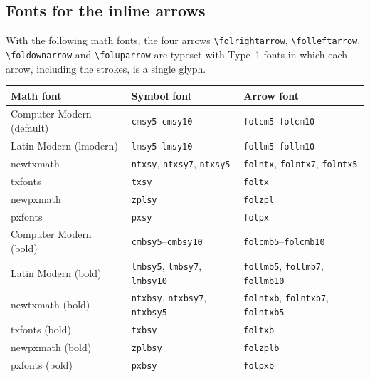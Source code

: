 \documentclass[dvipdfmx,a4paper]{article}
\newcommand\pkg[1]{\textsf{#1}}
\newcommand\file[1]{\texttt{#1}}
\begin{document}
\subsection{Fonts for the inline arrows}\label{sec:glyphs}
With the following math fonts, the four arrows \verb|\folrightarrow|, \verb|\folleftarrow|,
\verb|\foldownarrow| and \verb|\foluparrow| are typeset with Type~1 fonts in which each arrow,
including the strokes, is a single glyph.
\begin{center}
\begin{tabular}{lll}
Math font & Symbol font & Arrow font\\\hline
Computer Modern (default) & \file{cmsy5}--\file{cmsy10} & \file{folcm5}--\file{folcm10}\\
Latin Modern (\pkg{lmodern}) & \file{lmsy5}--\file{lmsy10} & \file{follm5}--\file{follm10}\\
\pkg{newtxmath} & \file{ntxsy}, \file{ntxsy7}, \file{ntxsy5} & \file{folntx}, \file{folntx7}, \file{folntx5}\\
\pkg{txfonts} & \file{txsy} & \file{foltx}\\
\pkg{newpxmath} & \file{zplsy} & \file{folzpl}\\
\pkg{pxfonts} & \file{pxsy} & \file{folpx}\\\hline
Computer Modern (bold) & \file{cmbsy5}--\file{cmbsy10} & \file{folcmb5}--\file{folcmb10}\\
Latin Modern (bold) & \file{lmbsy5}, \file{lmbsy7}, \file{lmbsy10} & \file{follmb5}, \file{follmb7}, \file{follmb10}\\
\pkg{newtxmath} (bold) & \file{ntxbsy}, \file{ntxbsy7}, \file{ntxbsy5} & \file{folntxb}, \file{folntxb7}, \file{folntxb5}\\
\pkg{txfonts} (bold) & \file{txbsy} & \file{foltxb}\\
\pkg{newpxmath} (bold) & \file{zplbsy} & \file{folzplb}\\
\pkg{pxfonts} (bold) & \file{pxbsy} & \file{folpxb}
\end{tabular}
\end{center}
\end{document}
